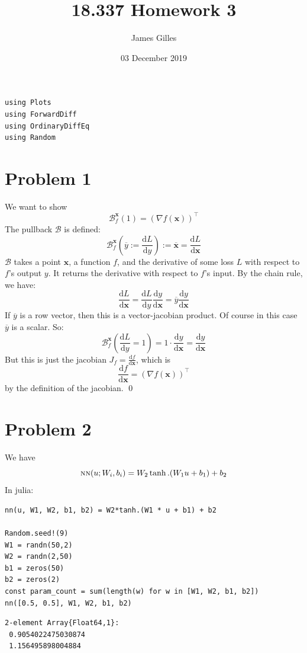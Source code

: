 \documentclass[11pt]{article}
\author{James Gilles}
\date{03 December 2019}
\title{18.337 Homework 3}
\newcommand{\B}[0]{\mathcal{B}}
\newcommand{\xv}[0]{\mathbf{x}}
\newcommand*\lgrad[1]{\overline{#1}}
\newcommand*\tderiv[2]{\frac{\mathrm{d}#1}{\mathrm{d}#2}}
\newcommand{\NN}[0]{\textsc{nn}}
\newcommand{\transpose}[1]{#1 ^\top}
\renewcommand*{\tableofcontents}[0]{}
\begin{document}
\maketitle
\tableofcontents

\begin{verbatim}
using Plots
using ForwardDiff
using OrdinaryDiffEq
using Random
\end{verbatim}

\section{Problem 1}
\label{sec:org2855902}
We want to show
$$\B_f^\xv(1) = \transpose{(\nabla f(\xv))}$$
The pullback \(\B\) is defined:
$$\B^\xv_f(\lgrad{y} := \tderiv{L}{y}) := \lgrad{\xv} = \tderiv{L}{\xv}$$
\(\B\) takes a point \(\xv\), a function \(f\), and the derivative of some loss \(L\) with respect to \(f\)'s output \(y\).
It returns the derivative with respect to \(f\)'s input.
By the chain rule, we have:
$$\tderiv{L}{\xv} = \tderiv{L}{y}\tderiv{y}{\xv} = \lgrad{y} \tderiv{y}{\xv}$$
If \(\lgrad{y}\) is a row vector, then this is a vector-jacobian product. Of course in this case \(\lgrad{y}\) is a scalar.
So:
$$\B^\xv_f(\tderiv{L}{y} = 1) = 1 \cdot \tderiv{y}{\xv} = \tderiv{y}{\xv}$$
But this is just the jacobian \(J_f=\tderiv{f}{\xv}\), which is
$$\tderiv{f}{\xv}=\transpose{(\nabla f(\xv))}$$
by the definition of the jacobian. \qed
\section{Problem 2}
\label{sec:org8da53b9}
We have $$\NN(u; W_i, b_i) = W_2 \tanh.(W_1 u + b_1) + b_2$$
In julia:
\begin{verbatim}
nn(u, W1, W2, b1, b2) = W2*tanh.(W1 * u + b1) + b2

Random.seed!(9)
W1 = randn(50,2)
W2 = randn(2,50)
b1 = zeros(50)
b2 = zeros(2)
const param_count = sum(length(w) for w in [W1, W2, b1, b2])
nn([0.5, 0.5], W1, W2, b1, b2)
\end{verbatim}

\begin{verbatim}
2-element Array{Float64,1}:
 0.9054022475030874
 1.156495898004884 
\end{verbatim}
\end{document}
